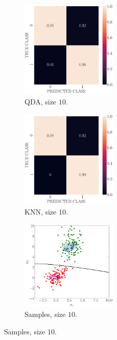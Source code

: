 \documentclass[12pt, a4 paper]{article}
\begin{document}
\begin{figure}[!htbp]
\centering
\quad \quad
    \begin{subfigure}[!htbp]{0.24\textwidth}
       \centering
       \includegraphics[width=1.8in]{../results/ex1/conf_mtx_QD_ML_dataset_P1c_size_10.pdf}
       \caption{QDA, size $10$.}
       \label{fig:QDA_P1c_10}
    \end{subfigure}
\quad \quad
    \begin{subfigure}[!htbp]{0.24\textwidth}
       \centering
       \includegraphics[width=1.8in]{../results/ex1/conf_mtx_KNN_dataset_P1c_size_10.pdf}
       \caption{KNN, size $10$.}
       \label{fig:KNN_P1c_10}
    \end{subfigure}
\quad \quad
    \begin{subfigure}[!htbp]{0.24\textwidth}
       \centering
       \includegraphics[width=1.8in]{../results/ex1/samples_QD_ML_dataset_P1c_size_10.pdf}
       \caption{Samples, size $10$.}
       \label{fig:KNN_P1c_10}
    \end{subfigure}
    

\end{figure}
\end{document}
